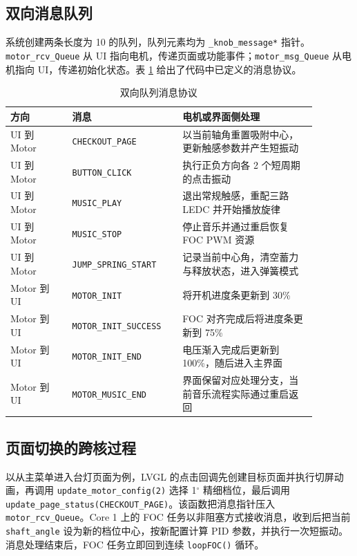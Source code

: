 \subsection{双向消息队列}

系统创建两条长度为 10 的队列，队列元素均为 \texttt{\_knob\_message*} 指针。\texttt{motor\_rcv\_Queue} 从 UI 指向电机，传递页面或功能事件；\texttt{motor\_msg\_Queue} 从电机指向 UI，传递初始化状态。表 \ref{tab:queue-protocol} 给出了代码中已定义的消息协议。

\begin{table}[H]
\centering
\small
\begin{tabular}{p{0.18\linewidth}p{0.31\linewidth}p{0.39\linewidth}}
\toprule
方向 & 消息 & 电机或界面侧处理 \\
\midrule
UI 到 Motor & \texttt{CHECKOUT\_PAGE} & 以当前轴角重置吸附中心，更新触感参数并产生短振动 \\
UI 到 Motor & \texttt{BUTTON\_CLICK} & 执行正负方向各 2 个短周期的点击振动 \\
UI 到 Motor & \texttt{MUSIC\_PLAY} & 退出常规触感，重配三路 LEDC 并开始播放旋律 \\
UI 到 Motor & \texttt{MUSIC\_STOP} & 停止音乐并通过重启恢复 FOC PWM 资源 \\
UI 到 Motor & \texttt{JUMP\_SPRING\_START} & 记录当前中心角，清空蓄力与释放状态，进入弹簧模式 \\
Motor 到 UI & \texttt{MOTOR\_INIT} & 将开机进度条更新到 30\% \\
Motor 到 UI & \texttt{MOTOR\_INIT\_SUCCESS} & FOC 对齐完成后将进度条更新到 75\% \\
Motor 到 UI & \texttt{MOTOR\_INIT\_END} & 电压渐入完成后更新到 100\%，随后进入主界面 \\
Motor 到 UI & \texttt{MOTOR\_MUSIC\_END} & 界面保留对应处理分支，当前音乐流程实际通过重启返回 \\
\bottomrule
\end{tabular}
\caption{双向队列消息协议}
\label{tab:queue-protocol}
\end{table}

\subsection{页面切换的跨核过程}

以从主菜单进入台灯页面为例，LVGL 的点击回调先创建目标页面并执行切屏动画，再调用 \texttt{update\_motor\_config(2)} 选择 1$^\circ$ 精细档位，最后调用 \texttt{update\_page\_status(CHECKOUT\_PAGE)}。该函数把消息指针压入 \texttt{motor\_rcv\_Queue}。Core 1 上的 FOC 任务以非阻塞方式接收消息，收到后把当前 \texttt{shaft\_angle} 设为新的档位中心，按新配置计算 PID 参数，并执行一次短振动。消息处理结束后，FOC 任务立即回到连续 \texttt{loopFOC()} 循环。


